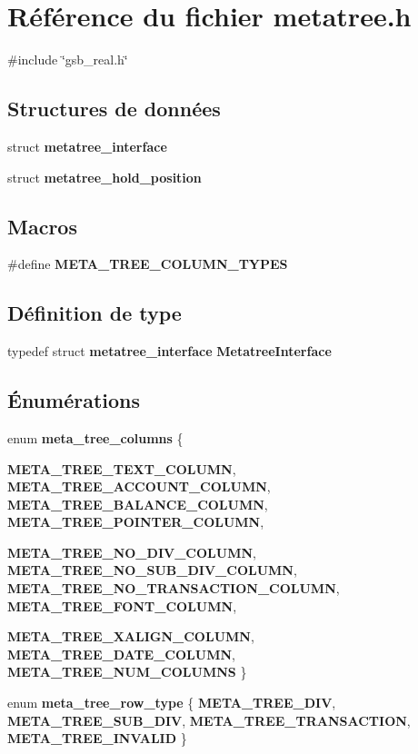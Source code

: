 \section{Référence du fichier metatree.h}
\label{metatree_8h}
{\ttfamily \#include \char`\"{}gsb\_\-real.h\char`\"{}}\par
\subsection*{Structures de données}
\begin{DoxyCompactItemize}
\item 
struct {\bf metatree\_\-interface}
\item 
struct {\bf metatree\_\-hold\_\-position}
\end{DoxyCompactItemize}
\subsection*{Macros}
\begin{DoxyCompactItemize}
\item 
\#define {\bf META\_\-TREE\_\-COLUMN\_\-TYPES}
\end{DoxyCompactItemize}
\subsection*{Définition de type}
\begin{DoxyCompactItemize}
\item 
typedef struct {\bf metatree\_\-interface} {\bf MetatreeInterface}
\end{DoxyCompactItemize}
\subsection*{Énumérations}
\begin{DoxyCompactItemize}
\item 
enum {\bf meta\_\-tree\_\-columns} \{ \par
{\bf META\_\-TREE\_\-TEXT\_\-COLUMN}, 
{\bf META\_\-TREE\_\-ACCOUNT\_\-COLUMN}, 
{\bf META\_\-TREE\_\-BALANCE\_\-COLUMN}, 
{\bf META\_\-TREE\_\-POINTER\_\-COLUMN}, 
\par
{\bf META\_\-TREE\_\-NO\_\-DIV\_\-COLUMN}, 
{\bf META\_\-TREE\_\-NO\_\-SUB\_\-DIV\_\-COLUMN}, 
{\bf META\_\-TREE\_\-NO\_\-TRANSACTION\_\-COLUMN}, 
{\bf META\_\-TREE\_\-FONT\_\-COLUMN}, 
\par
{\bf META\_\-TREE\_\-XALIGN\_\-COLUMN}, 
{\bf META\_\-TREE\_\-DATE\_\-COLUMN}, 
{\bf META\_\-TREE\_\-NUM\_\-COLUMNS}
 \}
\item 
enum {\bf meta\_\-tree\_\-row\_\-type} \{ {\bf META\_\-TREE\_\-DIV}, 
{\bf META\_\-TREE\_\-SUB\_\-DIV}, 
{\bf META\_\-TREE\_\-TRANSACTION}, 
{\bf META\_\-TREE\_\-INVALID}
 \}
\end{DoxyCompactItemize}
